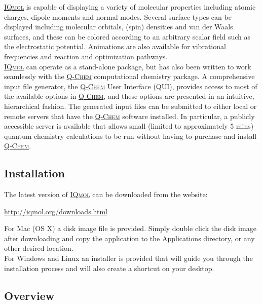 \documentclass[a4paper,12pt]{article}
\newcommand{\qchem}{\href{http://q-chem.com}{{\scshape Q-Chem}}}
\newcommand{\iqmol}{\href{http://iqmol.org}{{\scshape IQmol}}}
\begin{document}
\iqmol{} is capable of displaying a variety of molecular properties including
atomic charges, dipole moments and normal modes.  Several surface types can be
displayed including molecular orbitals, (spin) densities and van der Waals
surfaces, and these can be colored according to an arbitrary scalar field such
as the electrostatic potential.  Animations are also available for vibrational
frequencies and reaction and optimization pathways. \\

\iqmol{} can operate as a stand-alone package, but has also been written to
work seamlessly with the \qchem{} computational chemistry package.  A
comprehensive input file generator, the \qchem{} User Interface (QUI), provides
access to most of the available options in \qchem{}, and these options are
presented in an intuitive, hierarchical fashion.   The generated input files can
be submitted to either local or remote servers that have the \qchem{} software
installed.  In particular, a publicly accessible server is available that
allows small (limited to approximately 5 mins) quantum chemistry calculations to
be run without having to purchase and install \qchem{}.



\subsection{Installation}

The latest version of \iqmol{} can be downloaded from the website:
\begin{center}
\url{http://iqmol.org/downloads.html}
\end{center}

For Mac (OS X) a disk image file is provided.  Simply double click the disk
image after downloading and copy the application to the Applications directory,
or any other desired location. \\

For Windows and Linux an installer is provided that will guide you through the
installation process and will also create a shortcut on your desktop.


\newpage
\subsection{Overview}
\end{document}
